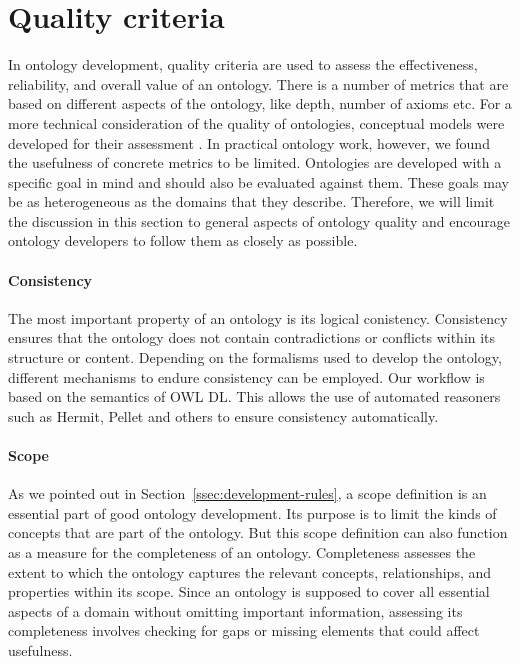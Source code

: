 \section{Quality criteria}


In ontology development, quality criteria are used to assess the effectiveness, reliability, and overall value of an ontology. There is a number of metrics that are based on different aspects of the ontology, like depth, number of axioms etc. For a more technical consideration of the quality of ontologies, conceptual models were developed for their assessment \cite{WilsonQuality2021, WilsonQuality2023}. In practical ontology work, however, we found the usefulness of concrete metrics to be limited. Ontologies are developed with a specific goal in mind and should also be evaluated against them. These goals may be as heterogeneous as the domains that they describe. Therefore, we will limit the discussion in this section to general aspects of ontology quality and encourage ontology developers to follow them as closely as possible. %

\paragraph{Consistency}

The most important property of an ontology is its logical conistency. Consistency ensures that the ontology does not contain contradictions or conflicts within its structure or content. Depending on the formalisms used to develop the ontology, different mechanisms to endure consistency can be employed. Our workflow is based on the semantics of OWL DL. This allows the use of automated reasoners such as Hermit, Pellet and others to ensure consistency automatically.

\paragraph{Scope}

As we pointed out in Section~\ref{ssec:development-rules}, a scope definition is an essential part of good ontology development. Its purpose is to limit the kinds of concepts that are part of the ontology. But this scope definition can also function as a measure for the completeness of an ontology. Completeness assesses the extent to which the ontology captures the relevant concepts, relationships, and properties within its scope. Since an ontology is supposed to cover all essential aspects of a domain without omitting important information, assessing its completeness involves checking for gaps or missing elements that could affect usefulness.

